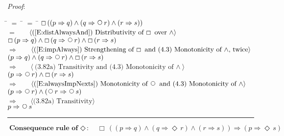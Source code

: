 \documentclass[12pt, fleqn, leqno]{article}
\newcommand{\lgap}{2pt}                             %
\newcommand{\mymathindent}{24pt}                    %
\newcommand{\impl}{\ensuremath{\Rightarrow}}        %
\newcommand{\Next}{\;\,\text{\raisebox{3.5pt}{\circle{6}}}}
\newcommand{\Event}{\Diamond\,}
\newcommand{\Always}{\Box\,}
\newcommand{\myqed}{\rule[-.23ex]{1.2ex}{2.0ex}}
\newcommand{\Gll} {\langle}                         %
\newcommand{\Ggg} {\rangle}                         %
\newcommand{\Hint}[1]     {\ \ \ $\Gll              \mbox{#1} \Ggg$ }   %
\begin{document}
\emph{Proof}:
\begin{tabbing}
\hspace{\mymathindent} \= $= \;$ \= $= \;$ \= \kill
  \> \>   $\Always ( (p \impl q) \land (q \impl \Next r) \land (r \impl s))$\\[\lgap]
   \> $=$  \>  \Hint{(\ref{E:distAlwaysAnd}) Distributivity of $\Always$ over $\land$}\\[\lgap]
  \> \>   $\Always ( p \impl q) \land \Always (q \impl \Next r) \land \Always (r \impl s)$\\[\lgap]
   \> $\impl$  \>  \Hint{(\ref{E:impAlways}) Strengthening of $\Always$ and (4.3) Monotonicity of $\land$, twice}\\[\lgap]
    \> \>   $ (p \impl q) \land (q \impl \Next r) \land \Always (r \impl s)$\\[\lgap]
    \> $\impl$  \>  \Hint{(3.82a) Transitivity and (4.3) Monotonicity of $\land$}\\[\lgap]
     \> \>   $ (p \impl \Next r) \land \Always (r \impl s)$\\[\lgap]
     \> $\impl$ \> \Hint{(\ref{E:alwaysImpNexts}) Monotonicity of $\Next$ and (4.3) Monotonicity of $\land$} \\[\lgap]
  \> \>   $ (p \impl \Next r) \land (\Next r \impl \Next s)$\\[\lgap]
  \> $\impl$  \>  \Hint{(3.82a) Transitivity}\\[\lgap]
  \> \>   $ p \impl \Next s$\quad \myqed
\end{tabbing}
\begin{equation}\label{E:EventConRule}
\textbf{Consequence rule of $\Event$:}\quad \Always ( (p \impl q) \land (q \impl \Event r) \land (r \impl s)) \impl (p \impl \Event s)
\end{equation}
\end{document}
